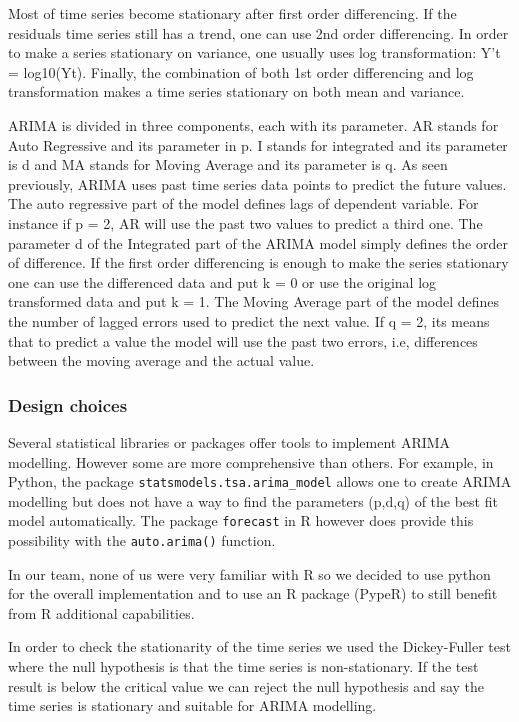\documentclass{article} %
\begin{document}
Most of time series become stationary after first order differencing. If the residuals time series still has a trend, one can use 2nd order differencing.
In order to make a series stationary on variance, one usually uses log transformation: Y’t = log10(Yt).
Finally, the combination of both 1st order differencing and log transformation makes a time series stationary on both mean and variance.

ARIMA is divided in three components, each with its parameter. AR stands for Auto Regressive and its parameter in p. I stands for integrated and its parameter is d and MA stands for Moving Average and its parameter is q.
As seen previously, ARIMA uses past time series data points to predict the future values. The auto regressive part of the model defines lags of dependent variable. For instance if p = 2, AR will use the past two values to predict a third one.
The parameter d of the Integrated part of the ARIMA model simply defines the order of difference. If the first order differencing is enough to make the series stationary one can use the differenced data and put k = 0 or use the original log transformed data and put k = 1.
The Moving Average part of the model defines the number of lagged errors used to predict the next value. If q = 2, its means that to predict a value the model will use the past two errors, i.e, differences between the moving average and the actual value.

\subsubsection*{Design choices}
Several statistical libraries or packages offer tools to implement ARIMA modelling. However some are more comprehensive than others. For example, in Python, the package \verb~statsmodels.tsa.arima_model~ allows one to create ARIMA modelling but does not have a way to find the parameters (p,d,q) of the best fit model automatically. The package \verb~forecast~ in R however does provide this possibility with the \verb~auto.arima()~ function.

In our team, none of us were very familiar with R so we decided to use python for the overall implementation and to use an R package (PypeR) to still benefit from R additional capabilities.

In order to check the stationarity of the time series we used the Dickey-Fuller test where the null hypothesis is that the time series is non-stationary. If the test result is below the critical value we can reject the null hypothesis and say the time series is stationary and suitable for ARIMA modelling.
\end{document}

